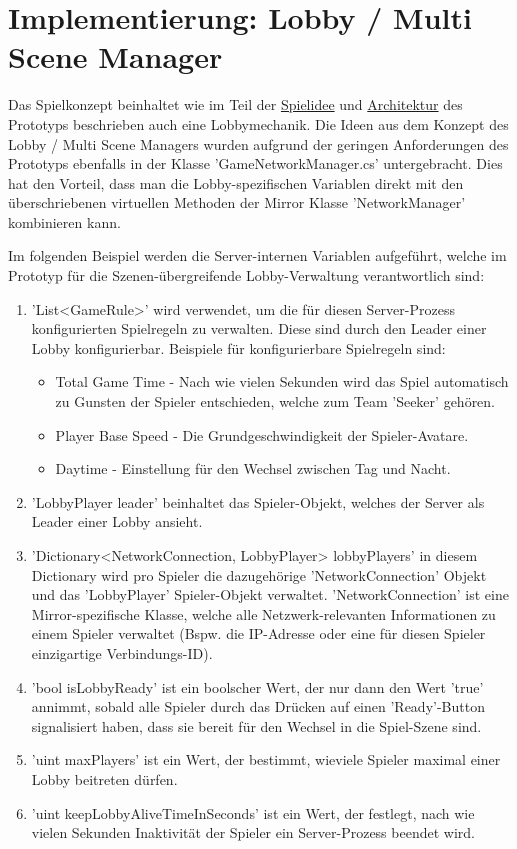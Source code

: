\section{Implementierung: Lobby / Multi Scene Manager}
\label{Lobby Manager Implementierung}

Das Spielkonzept beinhaltet wie im Teil der \hyperref[Spielidee]{Spielidee} und \hyperref[Architektur]{Architektur} des Prototyps beschrieben auch eine Lobbymechanik. Die Ideen aus dem Konzept des Lobby / Multi Scene Managers wurden aufgrund der geringen Anforderungen des Prototyps ebenfalls in der Klasse 'GameNetworkManager.cs' untergebracht. Dies hat den Vorteil, dass man die Lobby-spezifischen Variablen direkt mit den überschriebenen virtuellen Methoden der Mirror Klasse 'NetworkManager' kombinieren kann.

Im folgenden Beispiel werden die Server-internen Variablen aufgeführt, welche im Prototyp für die Szenen-übergreifende Lobby-Verwaltung verantwortlich sind:
    
\begin{enumerate}
	\item 'List<GameRule>' wird verwendet, um die für diesen Server-Prozess konfigurierten Spielregeln zu verwalten. Diese sind durch den Leader einer Lobby konfigurierbar. Beispiele für konfigurierbare Spielregeln sind:
	\begin{itemize}
		\item Total Game Time - Nach wie vielen Sekunden wird das Spiel automatisch zu Gunsten der Spieler entschieden, welche zum Team 'Seeker' gehören.
		\item Player Base Speed - Die Grundgeschwindigkeit der Spieler-Avatare.
		\item Daytime - Einstellung für den Wechsel zwischen Tag und Nacht.
	\end{itemize}
	\item 'LobbyPlayer leader' beinhaltet das Spieler-Objekt, welches der Server als Leader einer Lobby ansieht.
	\item 'Dictionary<NetworkConnection, LobbyPlayer> lobbyPlayers' in diesem Dictionary wird pro Spieler die dazugehörige 'NetworkConnection' Objekt und das 'LobbyPlayer' Spieler-Objekt verwaltet. 'NetworkConnection' ist eine Mirror-spezifische Klasse, welche alle Netzwerk-relevanten Informationen zu einem Spieler verwaltet (Bspw. die IP-Adresse oder eine für diesen Spieler einzigartige Verbindungs-ID).
	\item 'bool isLobbyReady' ist ein boolscher Wert, der nur dann den Wert 'true' annimmt, sobald alle Spieler durch das Drücken auf einen 'Ready'-Button signalisiert haben, dass sie bereit für den Wechsel in die Spiel-Szene sind.
	\item 'uint maxPlayers' ist ein Wert, der bestimmt, wieviele Spieler maximal einer Lobby beitreten dürfen.
	\item 'uint keepLobbyAliveTimeInSeconds' ist ein Wert, der festlegt, nach wie vielen Sekunden Inaktivität der Spieler ein Server-Prozess beendet wird.
\end{enumerate}

